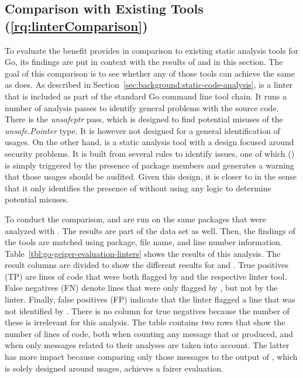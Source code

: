 
\subsection{Comparison with Existing Tools (\ref{rq:linterComparison})}\label{subsec:go-geiger:evaluation:linters-comparison}

To evaluate the benefit \toolGeiger{} provides in comparison to existing static analysis tools for Go, its findings are
put in context with the results of \toolVet{} and \toolGosec{} in this section.
The goal of this comparison is to see whether any of those tools can achieve the same as \toolGeiger{} does.
As described in Section~\ref{sec:background:static-code-analysis}, \toolVet{} is a linter that is included as part of
the standard Go command line tool chain.
It runs a number of analysis passes to identify general problems with the source code.
There is the \textit{unsafeptr} pass, which is designed to find potential misuses of the \textit{unsafe.Pointer} type.
It is however not designed for a general identification of \unsafe{} usages.
On the other hand, \toolGosec{} is a static analysis tool with a design focused around security problems.
It is built from several rules to identify issues, one of which (\textit{}) is simply triggered by the
presence of \unsafe{} package members and generates a warning that those usages should be audited.
Given this design, it is closer to \toolGeiger{} in the sense that it only identifies the presence of \unsafe{} without
using any logic to determine potential misuses.

To conduct the comparison, \toolVet{} and \toolGosec{} are run on the same \packagesAnalyzed{} packages that were
analyzed with \toolGeiger{}.
The results are part of the data set as well.
Then, the findings of the tools are matched using package, file name, and line number information.
Table~\ref{tbl:go-geiger-evaluation-linters} shows the results of this analysis.
The result columns are divided to show the different results for \toolVet{} and \toolGosec{}.
True positives (TP) are lines of code that were both flagged by \toolGeiger{} and the respective linter tool.
False negatives (FN) denote lines that were only flagged by \toolGeiger{}, but not by the linter.
Finally, false positives (FP) indicate that the linter flagged a line that was not identified by \toolGeiger{}.
There is no column for true negatives because the number of these is irrelevant for this analysis.
The table contains two rows that show the number of lines of code, both when counting any message that \toolVet{} or
\toolGosec{} produced, and when only messages related to their \unsafe{} analyses are taken into account.
The latter has more impact because comparing only those messages to the output of \toolGeiger{}, which is solely
designed around \unsafe{} usages, achieves a fairer evaluation.

